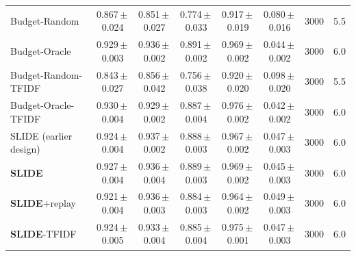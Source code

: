 \begin{table}[t]
{\begin{tabular}{@{}lccccccc@{}}
Budget-Random & 0.867\,$\pm$\,0.024 & 0.851\,$\pm$\,0.027 & 0.774\,$\pm$\,0.033 & 0.917\,$\pm$\,0.019 & 0.080\,$\pm$\,0.016 & 3000 & 5.5 \\
Budget-Oracle & 0.929\,$\pm$\,0.003 & 0.936\,$\pm$\,0.002 & 0.891\,$\pm$\,0.002 & 0.969\,$\pm$\,0.002 & 0.044\,$\pm$\,0.002 & 3000 & 6.0 \\
Budget-Random-TFIDF & 0.843\,$\pm$\,0.027 & 0.856\,$\pm$\,0.042 & 0.756\,$\pm$\,0.038 & 0.920\,$\pm$\,0.020 & 0.098\,$\pm$\,0.020 & 3000 & 5.5 \\
Budget-Oracle-TFIDF & 0.930\,$\pm$\,0.004 & 0.929\,$\pm$\,0.002 & 0.887\,$\pm$\,0.004 & 0.976\,$\pm$\,0.002 & 0.042\,$\pm$\,0.002 & 3000 & 6.0 \\
\midrule
SLIDE (earlier design) & 0.924\,$\pm$\,0.004 & 0.937\,$\pm$\,0.002 & 0.888\,$\pm$\,0.003 & 0.967\,$\pm$\,0.002 & 0.047\,$\pm$\,0.003 & 3000 & 6.0 \\
\textbf{SLIDE} & 0.927\,$\pm$\,0.004 & 0.936\,$\pm$\,0.004 & 0.889\,$\pm$\,0.003 & 0.969\,$\pm$\,0.002 & 0.045\,$\pm$\,0.003 & 3000 & 6.0 \\
\textbf{SLIDE}+replay & 0.921\,$\pm$\,0.004 & 0.936\,$\pm$\,0.003 & 0.884\,$\pm$\,0.003 & 0.964\,$\pm$\,0.002 & 0.049\,$\pm$\,0.003 & 3000 & 6.0 \\
\textbf{SLIDE}-TFIDF & 0.924\,$\pm$\,0.005 & 0.933\,$\pm$\,0.004 & 0.885\,$\pm$\,0.004 & 0.975\,$\pm$\,0.001 & 0.047\,$\pm$\,0.003 & 3000 & 6.0 \\
\bottomrule
\end{tabular}}
\end{table}
